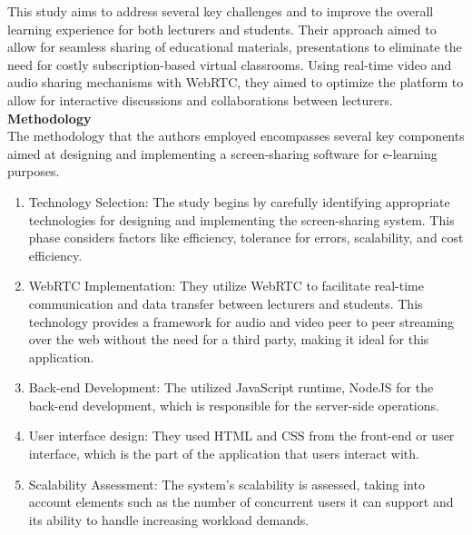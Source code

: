 \documentclass[a4paper,12pt]{article}  %
\begin{document}
This study aims to address several key challenges and to improve the overall
learning experience for both lecturers and students. Their approach aimed to
allow for seamless sharing of educational materials, presentations to eliminate
the need for costly subscription-based virtual classrooms. Using real-time
video and audio sharing mechanisms with WebRTC, they aimed to optimize the
platform to allow for interactive discussions and collaborations between
lecturers.\cite{emmanuel2022design}\\

\textbf{Methodology}\\
The methodology that the authors employed encompasses several key components aimed at designing and implementing a screen-sharing software for e-learning purposes.\\

\begin{enumerate}
  \item Technology Selection: The study begins by carefully identifying appropriate
        technologies for designing and implementing the screen-sharing system. This
        phase considers factors like efficiency, tolerance for errors, scalability, and
        cost efficiency.\\
  \item WebRTC Implementation: They utilize WebRTC to facilitate real-time
        communication and data transfer between lecturers and students. This technology
        provides a framework for audio and video peer to peer streaming over the web
        without the need for a third party, making it ideal for this application.\\
  \item Back-end Development: The utilized JavaScript runtime, NodeJS for the back-end
        development, which is responsible for the server-side operations.\\
  \item User interface design: They used HTML and CSS from the front-end or user
        interface, which is the part of the application that users interact with.\\
  \item Scalability Assessment: The system's scalability is assessed, taking into
        account elements such as the number of concurrent users it can support and its
        ability to handle increasing workload demands.\\
\end{enumerate}
\end{document}

